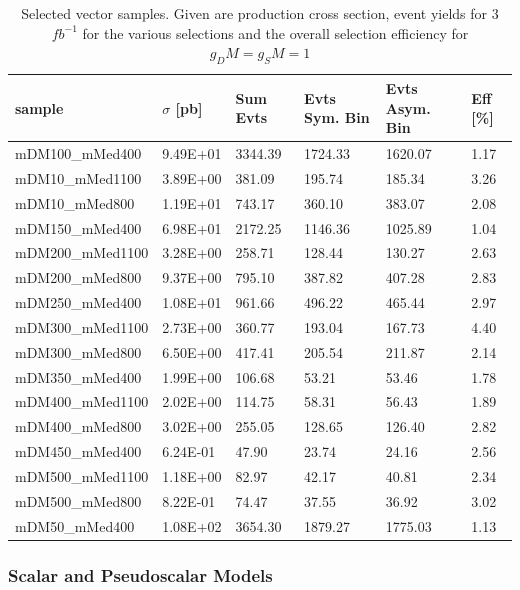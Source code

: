 \begin{table}[h]
\centering
\begin{tabular}{llllll}
\hline
sample             & $\sigma$ [pb] & Sum Evts       & Evts Sym. Bin & Evts Asym. Bin & Eff  [\%]   \\\hline
mDM100\_mMed400  & 9.49E+01 & 3344.39 & 1724.33 & 1620.07 & 1.17 \\
mDM10\_mMed1100  & 3.89E+00 & 381.09   & 195.74   & 185.34   & 3.26 \\
mDM10\_mMed800   & 1.19E+01 & 743.17   & 360.10   & 383.07   & 2.08 \\
mDM150\_mMed400  & 6.98E+01 & 2172.25 & 1146.36 & 1025.89 & 1.04 \\
mDM200\_mMed1100 & 3.28E+00 & 258.71   & 128.44   & 130.27   & 2.63 \\
mDM200\_mMed800  & 9.37E+00 & 795.10   & 387.82   & 407.28   & 2.83 \\
mDM250\_mMed400  & 1.08E+01 & 961.66   & 496.22   & 465.44   & 2.97 \\
mDM300\_mMed1100 & 2.73E+00 & 360.77   & 193.04   & 167.73   & 4.40 \\
mDM300\_mMed800  & 6.50E+00 & 417.41   & 205.54   & 211.87   & 2.14 \\
mDM350\_mMed400  & 1.99E+00 & 106.68   & 53.21    & 53.46    & 1.78 \\
mDM400\_mMed1100 & 2.02E+00 & 114.75   & 58.31    & 56.43    & 1.89 \\
mDM400\_mMed800  & 3.02E+00 & 255.05   & 128.65   & 126.40   & 2.82 \\
mDM450\_mMed400  & 6.24E-01 & 47.90    & 23.74    & 24.16    & 2.56 \\
mDM500\_mMed1100 & 1.18E+00 & 82.97    & 42.17    & 40.81    & 2.34 \\
mDM500\_mMed800  & 8.22E-01 & 74.47    & 37.55    & 36.92    & 3.02 \\
mDM50\_mMed400   & 1.08E+02 & 3654.30 & 1879.27 & 1775.03 & 1.13\\
\hline
\end{tabular}
\caption{Selected vector samples. Given are production cross section, event yields for 3 $fb^{-1 }$ for the various selections and the overall selection efficiency for $g_DM=g_SM=1$}
\label{tab:dm_V_g1_3fb}
\end{table}

\subsubsection{Scalar and Pseudoscalar Models} \label{sec:dm_pscalar}

